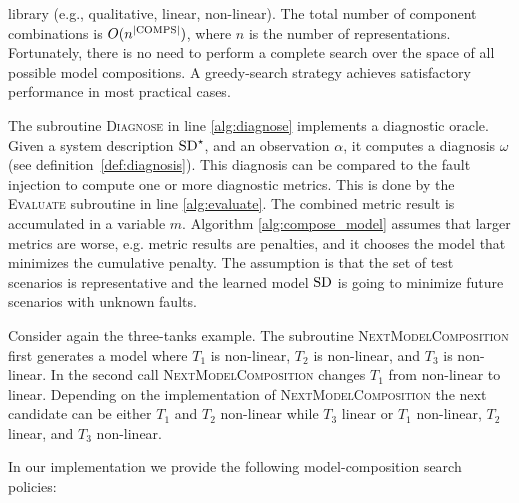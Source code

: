 library (e.g., qualitative, linear, non-linear). The total number of
component combinations is $O(n^{|\mathrm{COMPS}|})$, where $n$ is the
number of representations. Fortunately, there is no need to perform a
complete search over the space of all possible model compositions. A
greedy-search strategy achieves satisfactory performance in most
practical cases.
\par
The subroutine \textsc{Diagnose} in line \ref{alg:diagnose} implements
a diagnostic oracle. Given a system description $\mathrm{SD}^\star$, and an
observation $\alpha$, it computes a diagnosis $\omega$ (see
definition~\ref{def:diagnosis}). This diagnosis can be compared to the
fault injection to compute one or more diagnostic metrics. This is
done by the \textsc{Evaluate} subroutine in line
\ref{alg:evaluate}. The combined metric result is accumulated in a variable
$m$. Algorithm \ref{alg:compose_model} assumes that larger metrics are
worse, e.g. metric results are penalties, and it chooses the model
that minimizes the cumulative penalty. The assumption is that the set
of test scenarios is representative and the learned model $\mathrm{SD}$ is
going to minimize future scenarios with unknown faults.
\par
Consider again the three-tanks example. The subroutine
\textsc{NextModelComposition} first generates a model where $T_1$ is
non-linear, $T_2$ is non-linear, and $T_3$ is non-linear. In the second
call \textsc{NextModelComposition} changes $T_1$ from non-linear to
linear. Depending on the implementation of
\textsc{NextModelComposition} the next candidate can be either $T_1$
and $T_2$ non-linear while $T_3$ linear or $T_1$ non-linear, $T_2$
linear, and $T_3$ non-linear.
\par
In our implementation we provide the following model-composition
search policies:
%
